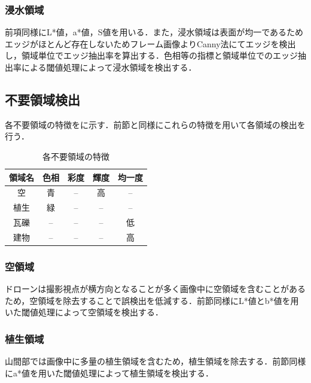 \documentclass[a4paper, twocolumn, xelatex, 9pt, ja=standard, Ligatures=TeX]{bxjsarticle}
\begin{document}
	\subsubsection{浸水領域}
		前項同様にL*値，a*値，S値を用いる．また，浸水領域は表面が均一であるためエッジがほとんど存在しないためフレーム画像よりCanny法にてエッジを検出し，領域単位でエッジ抽出率を算出する．色相等の指標と領域単位でのエッジ抽出率による閾値処理によって浸水領域を検出する．

\subsection{不要領域検出}
	各不要領域の特徴をに示す．前節と同様にこれらの特徴を用いて各領域の検出を行う．
	
	\begin{table}[h]
		\centering
		\caption{各不要領域の特徴}
		\label{tab02}
		\begin{tabular}{c c c c c}
			\hline
			領域名 & 色相 & 彩度 & 輝度 & 均一度 \\
			\hline
			\hline
			空 & 青 & -- & 高 & -- \\
			植生 & 緑 & -- & -- & -- \\
			瓦礫 & -- & -- & -- & 低 \\
			建物 & -- & -- & -- & 高 \\ \hline
		\end{tabular}
	\end{table}

\subsubsection{空領域}
	ドローンは撮影視点が横方向となることが多く画像中に空領域を含むことがあるため，空領域を除去することで誤検出を低減する．前節同様にL*値とb*値を用いた閾値処理によって空領域を検出する．
	
\subsubsection{植生領域}
	山間部では画像中に多量の植生領域を含むため，植生領域を除去する．前節同様にa*値を用いた閾値処理によって植生領域を検出する．
	
\end{document}
